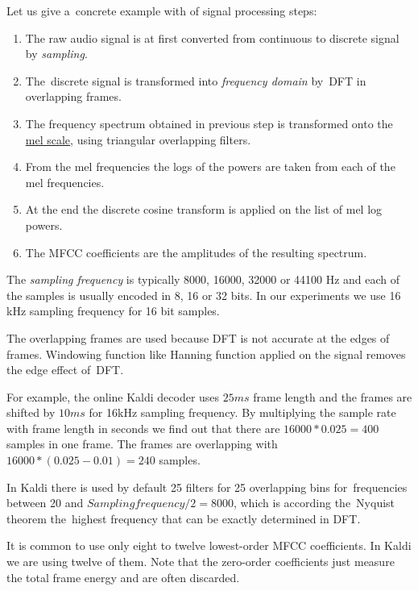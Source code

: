 Let us give a~concrete example with of signal processing steps: 
\small{\begin{enumerate}
    \item The raw audio signal is at first converted from continuous to discrete signal by {\it sampling}.  %
    \item The~discrete signal is transformed into {\it frequency domain}\/ by~\ac{DFT} in overlapping frames.
    \item The frequency spectrum obtained in previous step is transformed onto the \href{https://en.wikipedia.org/wiki/Mel_scale}{mel scale}, using triangular overlapping filters.
    \item From the mel frequencies the logs of the powers are taken from each of the mel frequencies.
    \item At the end the discrete cosine transform is applied on the list of mel log powers.
    \item The \ac{MFCC} coefficients are the amplitudes of the resulting spectrum.
\end{enumerate}
The {\it sampling frequency}\/ is typically 8000, 16000, 32000 or 44100 Hz and each of the samples is usually encoded in 8, 16 or 32 bits. In our experiments we use 16 kHz sampling frequency for 16 bit samples.  

The overlapping frames are used because \ac{DFT} is not accurate at the edges of frames. 
Windowing function like Hanning function applied on the signal removes the edge effect of~\ac{DFT}. 

For example,  the online Kaldi decoder uses $25ms$  frame length and the frames are shifted by $10ms$ for 16kHz sampling frequency. By multiplying the sample rate with frame length in seconds we find out that there are $16000 * 0.025 = 400$ samples in one frame. The frames are overlapping with $ 16000 * (0.025 - 0.01) = 240$ samples.

In Kaldi there is used by default 25 filters for 25 overlapping bins for~frequencies 
between 20 and $Sampling frequency / 2 = 8000$, which is according the~Nyquist theorem\cite{jerri1977shannon} 
the~highest frequency that can be exactly determined in \ac{DFT}.

It is common to use only eight to twelve lowest-order \ac{MFCC} coefficients. In Kaldi we are using twelve of them. 
Note that the zero-order coefficients just measure the total frame energy and are often discarded.
} %

